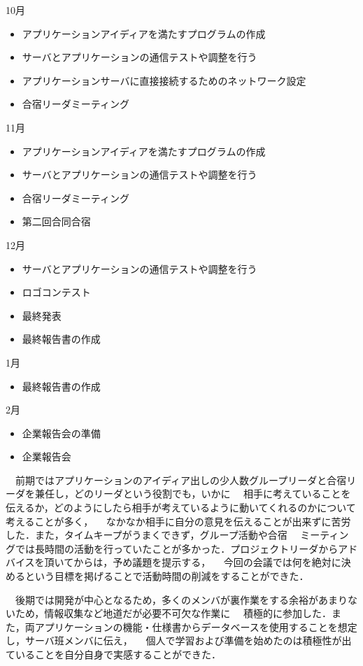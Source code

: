 10月
\begin{itemize}
\item アプリケーションアイディアを満たすプログラムの作成
\item サーバとアプリケーションの通信テストや調整を行う
\item アプリケーションサーバに直接接続するためのネットワーク設定
\item 合宿リーダミーティング
\end{itemize}
11月
\begin{itemize}
\item アプリケーションアイディアを満たすプログラムの作成
\item サーバとアプリケーションの通信テストや調整を行う
\item 合宿リーダミーティング
\item 第二回合同合宿
\end{itemize}
12月
\begin{itemize}
\item サーバとアプリケーションの通信テストや調整を行う
\item ロゴコンテスト
\item 最終発表
\item 最終報告書の作成
\end{itemize}
1月
\begin{itemize}
\item 最終報告書の作成
\end{itemize}
2月
\begin{itemize}
\item 企業報告会の準備
\item 企業報告会
\end{itemize}

\par
　前期ではアプリケーションのアイディア出しの少人数グループリーダと合宿リーダを兼任し，どのリーダという役割でも，いかに
　相手に考えていることを伝えるか，どのようにしたら相手が考えているように動いてくれるのかについて考えることが多く，
　なかなか相手に自分の意見を伝えることが出来ずに苦労した．また，タイムキープがうまくできず，グループ活動や合宿
　ミーティングでは長時間の活動を行っていたことが多かった．プロジェクトリーダからアドバイスを頂いてからは，予め議題を提示する，
　今回の会議では何を絶対に決めるという目標を掲げることで活動時間の削減をすることができた．
\par
　後期では開発が中心となるため，多くのメンバが裏作業をする余裕があまりないため，情報収集など地道だが必要不可欠な作業に
　積極的に参加した．また，両アプリケーションの機能・仕様書からデータベースを使用することを想定し，サーバ班メンバに伝え，
　個人で学習および準備を始めたのは積極性が出ていることを自分自身で実感することができた．

